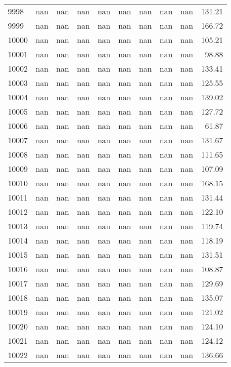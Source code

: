 \begin{tabular}{lrrrrrrrrr}
9998 & nan & nan & nan & nan & nan & nan & nan & nan & 131.21 \\
9999 & nan & nan & nan & nan & nan & nan & nan & nan & 166.72 \\
10000 & nan & nan & nan & nan & nan & nan & nan & nan & 105.21 \\
10001 & nan & nan & nan & nan & nan & nan & nan & nan & 98.88 \\
10002 & nan & nan & nan & nan & nan & nan & nan & nan & 133.41 \\
10003 & nan & nan & nan & nan & nan & nan & nan & nan & 125.55 \\
10004 & nan & nan & nan & nan & nan & nan & nan & nan & 139.02 \\
10005 & nan & nan & nan & nan & nan & nan & nan & nan & 127.72 \\
10006 & nan & nan & nan & nan & nan & nan & nan & nan & 61.87 \\
10007 & nan & nan & nan & nan & nan & nan & nan & nan & 131.67 \\
10008 & nan & nan & nan & nan & nan & nan & nan & nan & 111.65 \\
10009 & nan & nan & nan & nan & nan & nan & nan & nan & 107.09 \\
10010 & nan & nan & nan & nan & nan & nan & nan & nan & 168.15 \\
10011 & nan & nan & nan & nan & nan & nan & nan & nan & 131.44 \\
10012 & nan & nan & nan & nan & nan & nan & nan & nan & 122.10 \\
10013 & nan & nan & nan & nan & nan & nan & nan & nan & 119.74 \\
10014 & nan & nan & nan & nan & nan & nan & nan & nan & 118.19 \\
10015 & nan & nan & nan & nan & nan & nan & nan & nan & 131.51 \\
10016 & nan & nan & nan & nan & nan & nan & nan & nan & 108.87 \\
10017 & nan & nan & nan & nan & nan & nan & nan & nan & 129.69 \\
10018 & nan & nan & nan & nan & nan & nan & nan & nan & 135.07 \\
10019 & nan & nan & nan & nan & nan & nan & nan & nan & 121.02 \\
10020 & nan & nan & nan & nan & nan & nan & nan & nan & 124.10 \\
10021 & nan & nan & nan & nan & nan & nan & nan & nan & 124.12 \\
10022 & nan & nan & nan & nan & nan & nan & nan & nan & 136.66 \\

\end{tabular}
